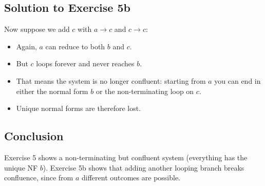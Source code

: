 \documentclass[11pt]{article}
\begin{document}
\subsection*{Solution to Exercise 5b}
Now suppose we add $c$ with $a\to c$ and $c\to c$:
\begin{itemize}
  \item Again, $a$ can reduce to both $b$ and $c$.
  \item But $c$ loops forever and never reaches $b$.
  \item That means the system is no longer confluent: starting from $a$ you can end
    in either the normal form $b$ or the non-terminating loop on $c$.
  \item Unique normal forms are therefore lost.
\end{itemize}

\subsection*{Conclusion}
Exercise 5 shows a non-terminating but confluent system (everything has the unique NF $b$).  
Exercise 5b shows that adding another looping branch breaks confluence, since from $a$
different outcomes are possible.
\end{document}
